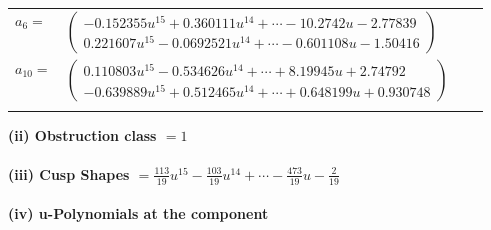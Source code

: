 \documentclass[1p]{elsarticle_modified}
\theoremstyle{definition}
\begin{document}
\begin{tabular}{m{7pt} m{180pt} m{7pt} m{180pt} }
\flushright $a_{6}=$&$\begin{pmatrix}-0.152355 u^{15}+0.360111 u^{14}+\cdots-10.2742 u-2.77839\\0.221607 u^{15}-0.0692521 u^{14}+\cdots-0.601108 u-1.50416\end{pmatrix}$ \\
\flushright $a_{10}=$&$\begin{pmatrix}0.110803 u^{15}-0.534626 u^{14}+\cdots+8.19945 u+2.74792\\-0.639889 u^{15}+0.512465 u^{14}+\cdots+0.648199 u+0.930748\end{pmatrix}$\\&\end{tabular}
\flushleft \textbf{(ii) Obstruction class $= 1$}\\~\\
\flushleft \textbf{(iii) Cusp Shapes $= \frac{113}{19} u^{15}-\frac{103}{19} u^{14}+\cdots-\frac{473}{19} u-\frac{2}{19}$}\\~\\
\newpage\renewcommand{\arraystretch}{1}
\flushleft \textbf{(iv) u-Polynomials at the component}\newline \\
\end{document}
